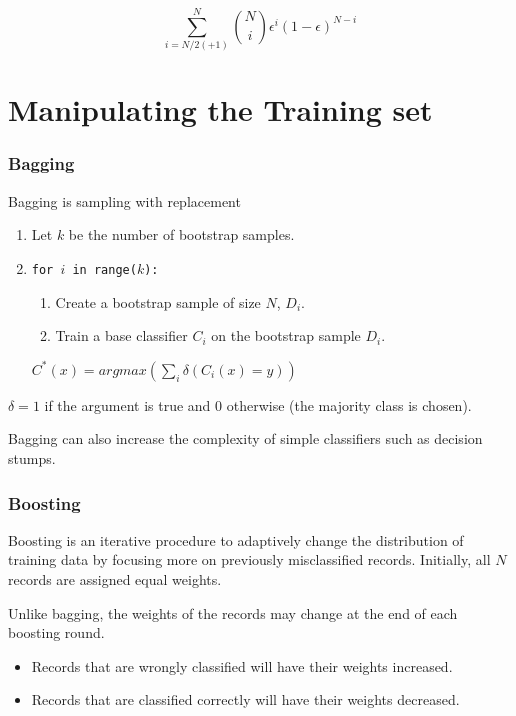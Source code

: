 \begin{equation}
    \sum_{i=N/2(+1)}^N \genfrac(){0pt}{2}{N}{i} \epsilon^i(1-\epsilon)^{N-i}
\end{equation}

\section{Manipulating the Training set}
\subsubsection{Bagging}
Bagging is sampling with replacement

\begin{enumerate}
    \item Let $k$ be the number of bootstrap samples.
    \item \texttt{for $i$ in range($k$):}
    \begin{enumerate}
        \item Create a bootstrap sample of size $N$, $D_i$.
        \item Train a base classifier $C_i$ on the bootstrap sample $D_i$.
    \end{enumerate}
    $C^{*}(x) = argmax\left(\sum_i \delta\left(C_i(x)=y\right)\right)$
\end{enumerate}

$\delta = 1$ if the argument is true and $0$ otherwise (the majority class is chosen).

Bagging can also increase the complexity of simple classifiers such as decision stumps.

\newpage
\subsubsection{Boosting}
Boosting is an iterative procedure to adaptively change the distribution of training data by focusing more on previously misclassified records.
Initially, all $N$ records are assigned equal weights.

Unlike bagging, the weights of the records may change at the end of each boosting round.

\begin{itemize}
    \item Records that are wrongly classified will have their weights increased.
    \item Records that are classified correctly will have their weights decreased.
\end{itemize}

